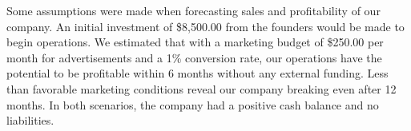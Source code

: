 Some assumptions were made when forecasting sales and profitability of our company. An initial investment of \$8,500.00 from the founders would be made to begin operations. We estimated that with a marketing budget of \$250.00 per month for advertisements and a 1\% conversion rate, our operations have the potential to be profitable within 6 months without any external funding. Less than favorable marketing conditions reveal our company breaking even after 12 months. In both scenarios, the company had a positive cash balance and no liabilities.




